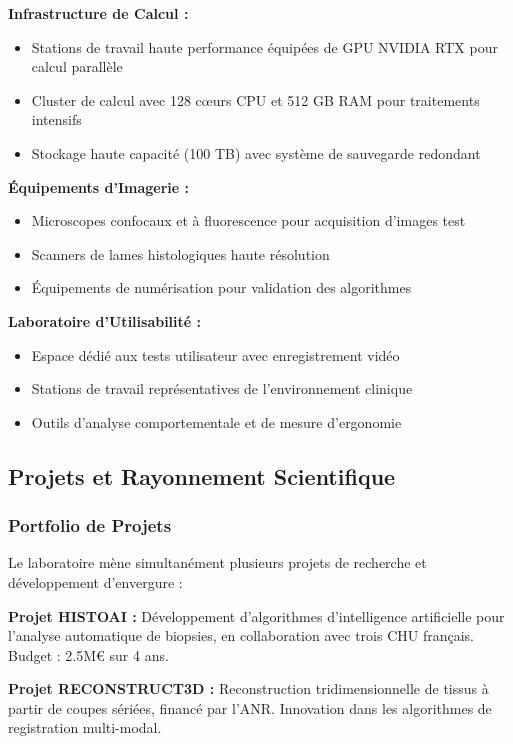 \documentclass[12pt,a4paper]{article}
\begin{document}
\textbf{Infrastructure de Calcul :}
\begin{itemize}
\item Stations de travail haute performance équipées de GPU NVIDIA RTX pour calcul parallèle
\item Cluster de calcul avec 128 cœurs CPU et 512 GB RAM pour traitements intensifs
\item Stockage haute capacité (100 TB) avec système de sauvegarde redondant
\end{itemize}

\textbf{Équipements d'Imagerie :}
\begin{itemize}
\item Microscopes confocaux et à fluorescence pour acquisition d'images test
\item Scanners de lames histologiques haute résolution
\item Équipements de numérisation pour validation des algorithmes
\end{itemize}

\textbf{Laboratoire d'Utilisabilité :}
\begin{itemize}
\item Espace dédié aux tests utilisateur avec enregistrement vidéo
\item Stations de travail représentatives de l'environnement clinique
\item Outils d'analyse comportementale et de mesure d'ergonomie
\end{itemize}

\subsection{Projets et Rayonnement Scientifique}

\subsubsection{Portfolio de Projets}

Le laboratoire mène simultanément plusieurs projets de recherche et développement d'envergure :

\textbf{Projet HISTOAI :} Développement d'algorithmes d'intelligence artificielle pour l'analyse automatique de biopsies, en collaboration avec trois CHU français. Budget : 2.5M€ sur 4 ans.

\textbf{Projet RECONSTRUCT3D :} Reconstruction tridimensionnelle de tissus à partir de coupes sériées, financé par l'ANR. Innovation dans les algorithmes de registration multi-modal.
\end{document}
